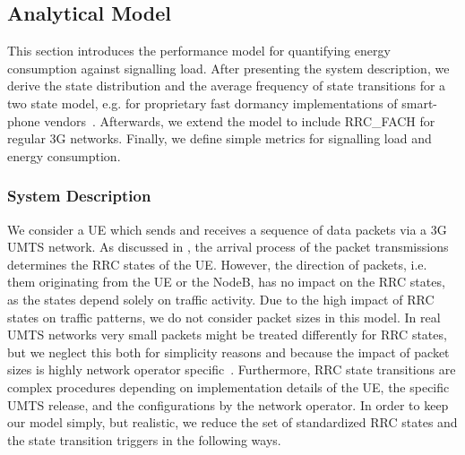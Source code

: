 \subsection{Analytical Model}\label{sec:network:performance_model:analytical_model}
This section introduces the performance model for quantifying energy consumption against signalling load.
After presenting the system description, we derive the state distribution and the average frequency of state transitions for a two state model, e.g. for proprietary fast dormancy implementations of smart-phone vendors~\cite{NSN2011}. 
Afterwards, we extend the model to include \gls{RRC_FACH} for regular \gls{3G} networks.
Finally, we define simple metrics for signalling load and energy consumption.

\newcommand{\PacketIAT}{A}

\subsubsection*{System Description}\label{sec:network:performance_model:analytical_model:system_description}
We consider a \gls{UE} which sends and receives a sequence of data packets via a \gls{3G} \gls{UMTS} network.
As discussed in , the arrival process of the packet transmissions determines the \gls{RRC} states of the \gls{UE}.
However, the direction of packets, i.e. them originating from the \gls{UE} or the \gls{NodeB}, has no impact on the \gls{RRC} states, as the states depend solely on traffic activity.
Due to the high impact of \gls{RRC} states on traffic patterns, we do not consider packet sizes in this model.
In real \gls{UMTS} networks very small packets might be treated differently for \gls{RRC} states, but we neglect this both for simplicity reasons and because the impact of packet sizes is highly network operator specific~\cite{Qian2010a}.
Furthermore, \gls{RRC} state transitions are complex procedures depending on implementation details of the \gls{UE}, the specific \gls{UMTS} release, and the configurations by the network operator.
In order to keep our model simply, but realistic, we reduce the set of standardized \gls{RRC} states and the state transition triggers in the following ways. 

